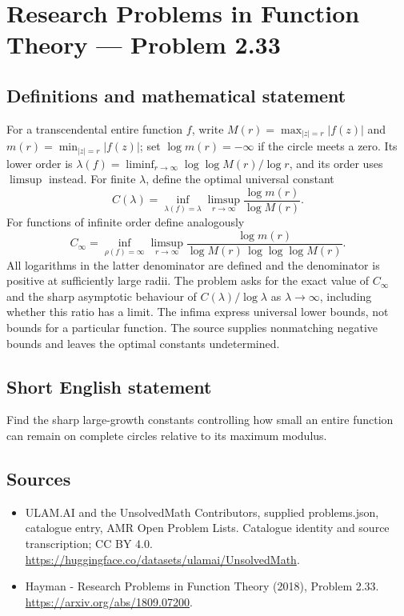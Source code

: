 \documentclass[11pt,a4paper]{article}
\begin{document}
\section*{Research Problems in Function Theory — Problem 2.33}\label{statement}

\subsection{Definitions and mathematical statement}
For a transcendental entire function $f$, write
$M(r)=\max_{|z|=r}|f(z)|$ and $m(r)=\min_{|z|=r}|f(z)|$; set $\log m(r)=-\infty$ if the circle meets a zero.
Its lower order is $\lambda(f)=\liminf_{r\to\infty}\log\log M(r)/\log r$, and its order uses $\limsup$ instead. For finite $\lambda$, define the optimal universal constant
\[
C(\lambda)=\inf_{\lambda(f)=\lambda}
\limsup_{r\to\infty}\frac{\log m(r)}{\log M(r)}.
\]
For functions of infinite order define analogously
\[
C_\infty=\inf_{\rho(f)=\infty}
\limsup_{r\to\infty}
\frac{\log m(r)}{\log M(r)\,\log\log\log M(r)}.
\]
All logarithms in the latter denominator are defined and the denominator is positive at sufficiently large radii. The problem asks for the exact value of $C_\infty$ and the sharp asymptotic behaviour of $C(\lambda)/\log\lambda$ as $\lambda\to\infty$, including whether this ratio has a limit. The infima express universal lower bounds, not bounds for a particular function. The source supplies nonmatching negative bounds and leaves the optimal constants undetermined.
\subsection{Short English statement}
Find the sharp large-growth constants controlling how small an entire function can remain on complete circles relative to its maximum modulus.
\subsection{Sources}
\begin{itemize}
\item[S1] ULAM.AI and the UnsolvedMath Contributors, supplied problems.json, catalogue entry, AMR Open Problem Lists. Catalogue identity and source transcription; CC BY 4.0.
\url{https://huggingface.co/datasets/ulamai/UnsolvedMath}.
\item[S2] Hayman - Research Problems in Function Theory (2018), Problem 2.33. 
\url{https://arxiv.org/abs/1809.07200}.
\end{itemize}
\end{document}
